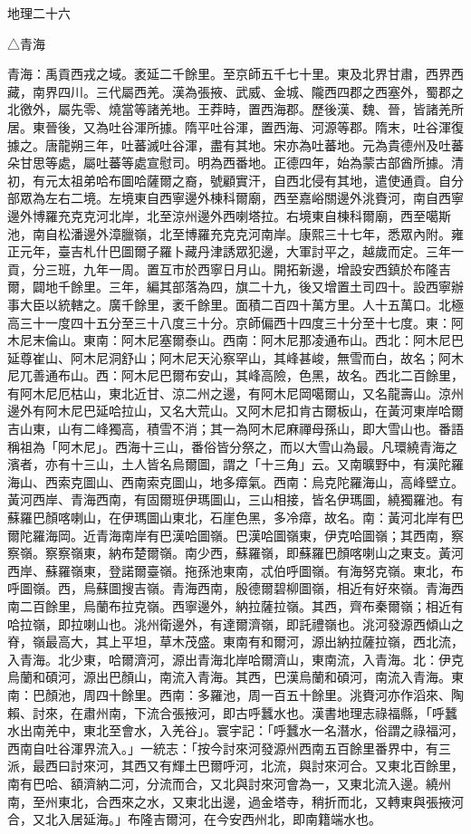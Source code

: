 
\begin{pinyinscope}
地理二十六

△青海

青海：禹貢西戎之域。袤延二千餘里。至京師五千七十里。東及北界甘肅，西界西藏，南界四川。三代屬西羌。漢為張掖、武威、金城、隴西四郡之西塞外，蜀郡之北徼外，屬先零、燒當等諸羌地。王莽時，置西海郡。歷後漢、魏、晉，皆諸羌所居。東晉後，又為吐谷渾所據。隋平吐谷渾，置西海、河源等郡。隋末，吐谷渾復據之。唐龍朔三年，吐蕃滅吐谷渾，盡有其地。宋亦為吐蕃地。元為貴德州及吐蕃朵甘思等處，屬吐蕃等處宣慰司。明為西番地。正德四年，始為蒙古部酋所據。清初，有元太祖弟哈布圖哈薩爾之裔，號顧實汗，自西北侵有其地，遣使通貢。自分部眾為左右二境。左境東自西寧邊外棟科爾廟，西至嘉峪關邊外洮賚河，南自西寧邊外博羅充克克河北岸，北至涼州邊外西喇塔拉。右境東自棟科爾廟，西至噶斯池，南自松潘邊外漳臘嶺，北至博羅充克克河南岸。康熙三十七年，悉眾內附。雍正元年，臺吉札什巴圖爾子羅卜藏丹津誘眾犯邊，大軍討平之，越歲而定。三年一貢，分三班，九年一周。置互市於西寧日月山。開拓新邊，增設安西鎮於布隆吉爾，闢地千餘里。三年，編其部落為四，旗二十九，後又增置土司四十。設西寧辦事大臣以統轄之。廣千餘里，袤千餘里。面積二百四十萬方里。人十五萬口。北極高三十一度四十五分至三十八度三十分。京師偏西十四度三十分至十七度。東：阿木尼末倫山。東南：阿木尼塞爾泰山。西南：阿木尼那凌通布山。西北：阿木尼巴延尊崔山、阿木尼洞舒山；阿木尼天沁察罕山，其峰甚峻，無雪而白，故名；阿木尼兀善通布山。西：阿木尼巴爾布安山，其峰高險，色黑，故名。西北二百餘里，有阿木尼厄枯山，東北近甘、涼二州之邊，有阿木尼岡噶爾山，又名龍壽山。涼州邊外有阿木尼巴延哈拉山，又名大荒山。又阿木尼扣肯古爾板山，在黃河東岸哈爾吉山東，山有二峰獨高，積雪不消；其一為阿木尼麻禪母孫山，即大雪山也。番語稱祖為「阿木尼」。西海十三山，番俗皆分祭之，而以大雪山為最。凡環繞青海之濱者，亦有十三山，土人皆名烏爾圖，謂之「十三角」云。又南曠野中，有漢陀羅海山、西索克圖山、西南索克圖山，地多瘴氣。西南：烏克陀羅海山，高峰壁立。黃河西岸、青海西南，有固爾班伊瑪圖山，三山相接，皆名伊瑪圖，繞獨羅池。有蘇羅巴顏喀喇山，在伊瑪圖山東北，石崖色黑，多冷瘴，故名。南：黃河北岸有巴爾陀羅海岡。近青海南岸有巴漢哈圖嶺。巴漢哈圖嶺東，伊克哈圖嶺；其西南，察察嶺。察察嶺東，納布楚爾嶺。南少西，蘇羅嶺，即蘇羅巴顏喀喇山之東支。黃河西岸、蘇羅嶺東，登諾爾臺嶺。拖孫池東南，忒伯呼圖嶺。有海努克嶺。東北，布呼圖嶺。西，烏蘇圖搜吉嶺。青海西南，殷德爾碧柳圖嶺，相近有好來嶺。青海西南二百餘里，烏蘭布拉克嶺。西寧邊外，納拉薩拉嶺。其西，齊布秦爾嶺；相近有哈拉嶺，即拉喇山也。洮州衛邊外，有達爾濟嶺，即託禮嶺也。洮河發源西傾山之脊，嶺最高大，其上平坦，草木茂盛。東南有和爾河，源出納拉薩拉嶺，西北流，入青海。北少東，哈爾濟河，源出青海北岸哈爾濟山，東南流，入青海。北：伊克烏蘭和碩河，源出巴顏山，南流入青海。其西，巴漢烏蘭和碩河，南流入青海。東南：巴顏池，周四十餘里。西南：多羅池，周一百五十餘里。洮賚河亦作滔來、陶賴、討來，在肅州南，下流合張掖河，即古呼蠶水也。漢書地理志祿福縣，「呼蠶水出南羌中，東北至會水，入羌谷」。寰宇記：「呼蠶水一名潛水，俗謂之祿福河，西南自吐谷渾界流入。」一統志：「按今討來河發源州西南五百餘里番界中，有三派，最西曰討來河，其西又有輝土巴爾呼河，北流，與討來河合。又東北百餘里，南有巴哈、額濟納二河，分流而合，又北與討來河會為一，又東北流入邊。繞州南，至州東北，合西來之水，又東北出邊，過金塔寺，稍折而北，又轉東與張掖河合，又北入居延海。」布隆吉爾河，在今安西州北，即南籍端水也。
\end{pinyinscope}
